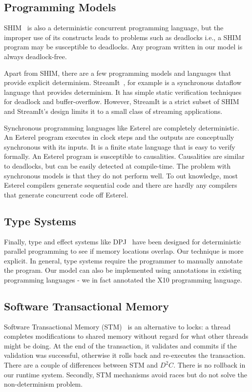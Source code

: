 \documentclass[10pt, conference, compsocconf]{IEEEtran}
\begin{document}
\subsection{Programming Models} 
 
SHIM~\cite{edwards2005shim2,tardieu2006scheduling-independent} is also
a deterministic concurrent programming language, but the improper use
of its constructs leads to problems such as deadlocks i.e., a SHIM program
may be susceptible to deadlocks. Any program written in our model is always
deadlock-free.
 
Apart from SHIM, there are  a few programming models and languages 
that provide explicit determinism. StreamIt~\cite{thies2001streamit}, for 
example is a synchronous dataflow language that provides determinism. It 
has simple static verification techniques for deadlock and buffer-overflow. 
However, StreamIt is a strict subset of SHIM and StreamIt's design 
limits it to a small class of streaming applications. 
 
Synchronous programming languages like Esterel are completely deterministic. An Esterel program 
executes in clock steps and the outputs are conceptually synchronous with its inputs. 
It is a finite state language that is easy to verify formally. An Esterel program is susceptible 
to causalities. Causalities are similar to deadlocks, but can be easily detected at compile-time. 
The problem with synchronous models is that they do not perform well. To out knowledge, 
most Esterel compilers generate sequential code and there are hardly any compilers that generate 
concurrent code off Esterel. 
 
\subsection{Type Systems} 
 
Finally, type and effect systems like DPJ~\cite{bocchino2009type} 
 have been designed for deterministic parallel programming to see if
memory locations overlap. Our technique is more explicit. 
In general, type systems require the programmer to manually annotate the program. Our model can also be implemented using annotations in existing
programming languages - we in fact annotated the X10 programming language.
 
\subsection{Software Transactional Memory} 
Software Transactional Memory (STM)~\cite{shavit1995software} 
  is an alternative to locks: a thread completes modifications to  
shared memory without regard for what other threads might be doing. At the end of the transaction, 
it validates and commits if the validation was successful, otherwise it rolls back and re-executes 
the transaction. There are a couple of differences between STM and $D^2C$.
There is no rollback in our runtime system. Secondly,
 STM mechanisms avoid races but do not solve the non-determinism problem. 
 
\end{document}
